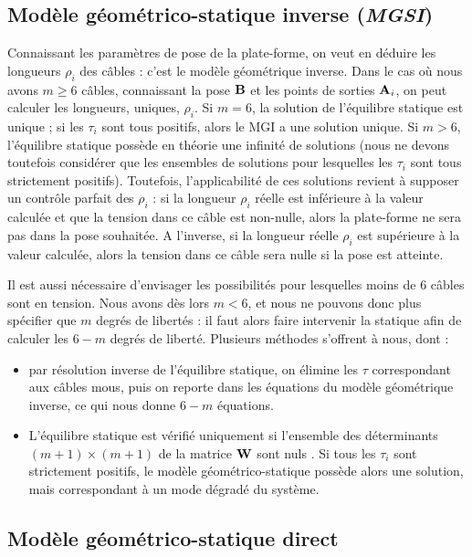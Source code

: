 \subsection{Modèle géométrico-statique inverse ({\it MGSI})} 
\label{chap0-2-3}

Connaissant les paramètres de pose de la plate-forme, on veut en déduire les 
longueurs $\rho_i$ des câbles : c'est le modèle géométrique inverse. 
Dans le cas où nous avons $m \geq 6$ câbles, connaissant la pose ${\bf B}$ et 
les points de sorties ${\bf A}_i$, on peut calculer les longueurs, uniques, 
$\rho_i$. Si $m = 6$, la solution de l'équilibre statique est unique ; si les 
$\tau_i$ sont tous positifs, alors le MGI a une solution unique. 
Si $m > 6$, l'\'equilibre statique possède en théorie une infinité de solutions 
(nous ne devons toutefois consid\'erer que les ensembles de solutions pour 
lesquelles les $\tau_i$ sont tous strictement positifs). Toutefois, 
l'applicabilit\'e de ces solutions revient \`a supposer un contr\^ole parfait 
des $\rho_i$ : si la longueur $\rho_i$ r\'eelle est inf\'erieure \`a la valeur 
calcul\'ee et que la tension dans ce c\^able est non-nulle, alors la 
plate-forme ne sera pas dans la pose souhait\'ee. A l'inverse, si la 
longueur r\'eelle $\rho_i$ est sup\'erieure \`a la valeur calcul\'ee, alors la 
tension dans ce c\^able sera nulle si la pose est atteinte.

Il est aussi n\'ecessaire d'envisager les possibilit\'es pour lesquelles moins 
de $6$ c\^ables sont en tension. Nous avons d\`es lors $m < 6$, et nous ne 
pouvons donc plus sp\'ecifier que $m$ degr\'es de libert\'es : il faut alors 
faire intervenir la statique afin de calculer les $6-m$ degr\'es de libert\'e. 
Plusieurs m\'ethodes s'offrent \`a nous, dont :
\begin{itemize}
 \item par r\'esolution inverse de l'\'equilibre statique, on \'elimine les 
$\tau$ correspondant aux c\^ables mous, puis on reporte dans les \'equations du 
mod\`ele g\'eom\'etrique inverse, ce qui nous donne $6-m$ \'equations.
\item L'équilibre statique est vérifié 
uniquement si l'ensemble des déterminants $(m+1) \times (m+1)$ de la matrice 
${\bf W}$ sont nuls \cite{carricato_merlet2013}. Si tous les $\tau_i$ sont 
strictement positifs, le modèle géométrico-statique possède alors une solution, 
mais correspondant à un mode dégradé du système.
\end{itemize}


\subsection{Modèle géométrico-statique direct}\label{chap0-2-4}


